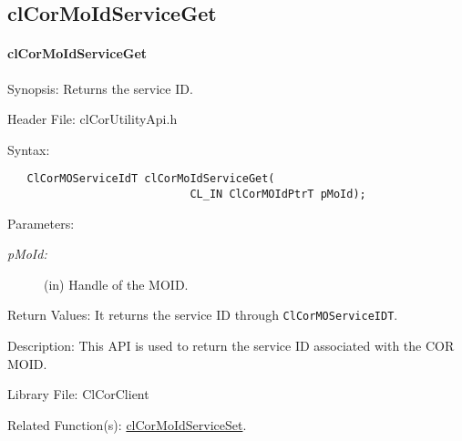 \begin{flushleft}
\subsection{clCorMoIdServiceGet}
\hypertarget{pagecor129}{}\paragraph{cl\-Cor\-MoId\-Service\-Get}\label{pagecor129}
\begin{Desc}
\item[Synopsis:]Returns the service ID.\end{Desc}
\begin{Desc}
\item[Header File:]clCorUtilityApi.h\end{Desc}
\begin{Desc}
\item[Syntax:]

\footnotesize\begin{verbatim}   ClCorMOServiceIdT clCorMoIdServiceGet(
                   			CL_IN ClCorMOIdPtrT pMoId);
\end{verbatim}
\normalsize
\end{Desc}
\begin{Desc}
\item[Parameters:]
\begin{description}
\item[{\em p\-MoId:}](in) Handle of the MOID.\end{description}
\end{Desc}
\begin{Desc}
\item[Return Values:]It returns the service ID through {\tt{Cl\-Cor\-MOService\-ID\-T}}.\end{Desc}
\begin{Desc}
\item[Description:]This API is used to return the service ID associated with the COR MOID.\end{Desc}
\begin{Desc}
\item[Library File:]Cl\-Cor\-Client\end{Desc}
\begin{Desc}
\item[Related Function(s):]\hyperlink{pagecor246}{cl\-Cor\-MoId\-Service\-Set}. \end{Desc}
\newpage



\end{flushleft}
